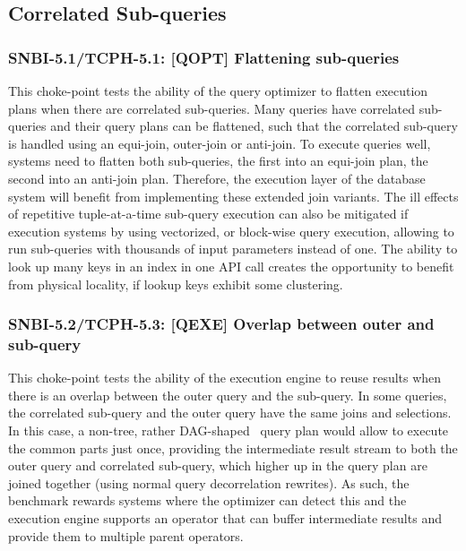 
\subsection{Correlated Sub-queries}

\subsubsection{SNBI-5.1/TCPH-5.1: [QOPT]  Flattening sub-queries}
\label{choke_point_5.1}
This choke-point tests the ability of the query optimizer to flatten execution plans when there are correlated sub-queries. Many queries have correlated sub-queries and their query plans can be flattened,
such that the correlated sub-query is handled using an equi-join, outer-join or anti-join. To execute queries well, systems need to flatten both sub-queries, the first into an equi-join plan, the second into an anti-join plan.
Therefore, the execution layer of the database system will benefit from implementing these extended join variants.
The ill effects of repetitive tuple-at-a-time sub-query execution can also be mitigated if execution systems by using vectorized, or block-wise query execution, allowing to run sub-queries with thousands of input parameters instead of one.
The ability to look up many keys in an index in one API call creates the opportunity to benefit from physical locality, if lookup keys exhibit some clustering.

\subsubsection{SNBI-5.2/TCPH-5.3: [QEXE] Overlap between outer and sub-query}
\label{choke_point_5.2}
This choke-point tests the ability of the execution engine to reuse results when there is an overlap between the outer query and the sub-query. In some queries, the correlated sub-query and the outer query have the same joins and selections.
In this case, a non-tree, rather DAG-shaped~\cite{DBLP:conf/btw/NeumannM09} query plan would allow to execute the common parts just once, providing the intermediate result stream to both the outer query and correlated sub-query,
which higher up in the query plan are joined together (using normal query decorrelation rewrites).
As such, the benchmark rewards systems where the optimizer can detect this and the execution engine supports an operator that can buffer intermediate results and provide them to multiple parent operators.

